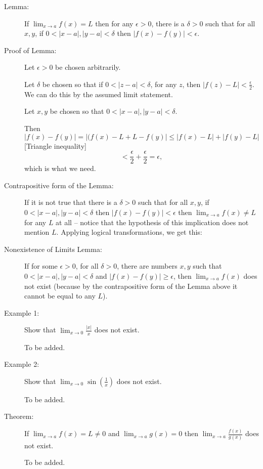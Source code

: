 \documentclass[12pt]{article}
\begin{document}
\begin{description}

\item[Lemma:]  If $\lim_{x \rightarrow a}f(x)=L$ then for any $\epsilon>0$, there is a $\delta>0$ such that for all $x,y$, if $0 <|x-a|, |y-a|<\delta$ then $|f(x)-f(y)|<\epsilon$.

\item[Proof of Lemma:]  Let $\epsilon>0$ be chosen arbitrarily.

Let $\delta$ be chosen so that if $0<|z-a|<\delta$, for any $z$, then $|f(z)-L|<\frac{\epsilon}2$.  We can do this by the assumed limit statement.

Let $x,y$ be chosen so that $0<|x-a|,|y-a|<\delta$.  

Then $$|f(x)-f(y)|=|(f(x)-L+L-f(y)| \leq |f(x)-L|+|f(y)-L|$$ [Triangle inequality] $$< \frac{\epsilon}2+\frac{\epsilon}2 = \epsilon,$$ which is what we need.

\item[Contrapositive form of the Lemma:]  If it is not true that there is a $\delta>0$ such that for all $x,y$, if $0 <|x-a|, |y-a|<\delta$ then $|f(x)-f(y)|<\epsilon$
then  $\lim_{x \rightarrow a}f(x)\neq L$ for any $L$ at all -- notice that the hypothesis of this implication does not mention $L$.  Applying logical transformations, we get
this:

\item[Nonexistence of Limits Lemma:]  If for some $\epsilon>0$, for all $\delta>0$, there are numbers $x,y$ such that $0<|x-a|,|y-a|<\delta$ and $|f(x)-f(y)|\geq \epsilon$, then
$\lim_{x \rightarrow a}f(x)$ does not exist (because by the contrapositive form of the Lemma above it cannot be equal to any $L$).

\item[Example 1:]  Show that $\lim_{x \rightarrow 0}\frac{|x|}{x}$ does not exist.

To be added.

\item[Example 2:]  Show that $\lim_{x \rightarrow 0}\sin(\frac1 x)$ does not exist.

To be added.

\item[Theorem:]  If $\lim_{x \rightarrow a} f(x)=L \neq 0$ and $\lim_{x \rightarrow a}g(x)=0$ then $\lim_{x \rightarrow a}\frac{f(x)}{g(x)}$ does not exist.

To be added.

\end{description}
\end{document}
